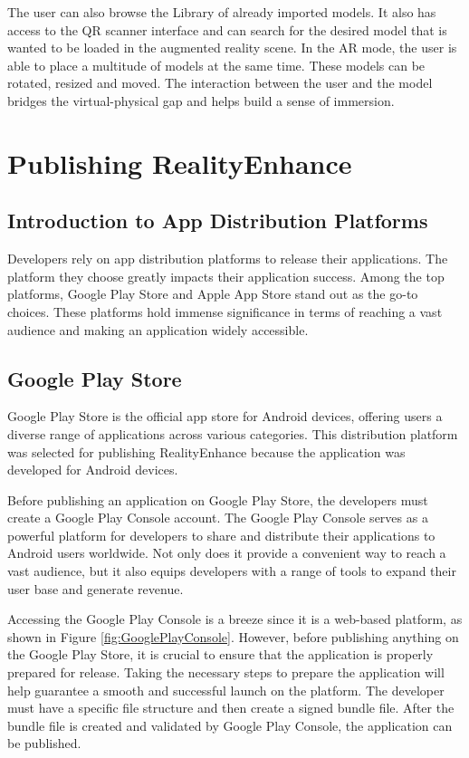 The user can also browse the Library of already imported models. It also has access to the QR scanner interface and can search for the desired model that is wanted to be loaded in the augmented reality scene. In the \ac{AR} mode, the user is able to place a multitude of models at the same time. These models can be rotated, resized and moved. The interaction between the user and the model bridges the virtual-physical gap and helps build a sense of immersion.

\newpage
\section{Publishing RealityEnhance}
\subsection*{Introduction to App Distribution Platforms}
Developers rely on app distribution platforms to release their applications. The platform they choose greatly impacts their application success. Among the top platforms, Google Play Store and Apple App Store stand out as the go-to choices. These platforms hold immense significance in terms of reaching a vast audience and making an application widely accessible.

\subsection*{Google Play Store}
Google Play Store is the official app store for Android devices\cite{GooglePlay}, offering users a diverse range of applications across various categories. This distribution platform was selected for publishing RealityEnhance because the application was developed for Android devices.

Before publishing an application on Google Play Store, the developers must create a Google Play Console account. The Google Play Console serves as a powerful platform for developers to share and distribute their applications to Android users worldwide. Not only does it provide a convenient way to reach a vast audience, but it also equips developers with a range of tools to expand their user base and generate revenue.

Accessing the Google Play Console is a breeze since it is a web-based platform, as shown in Figure \ref*{fig:GooglePlayConsole}. However, before publishing anything on the Google Play Store, it is crucial to ensure that the application is properly prepared for release. Taking the necessary steps to prepare the application will help guarantee a smooth and successful launch on the platform. The developer must have a specific file structure and then create a signed bundle file. After the bundle file is created and validated by Google Play Console, the application can be published.

